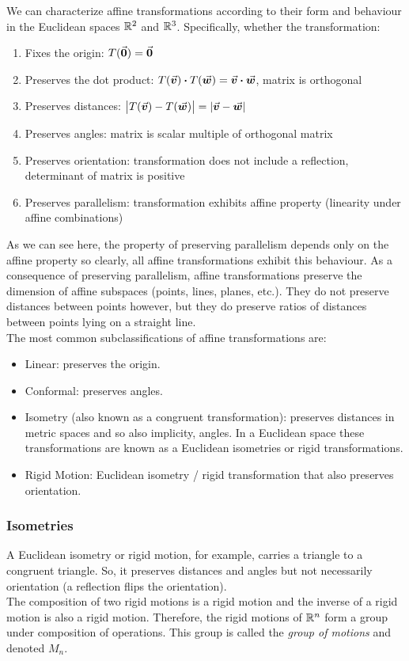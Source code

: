 \documentclass[MathsNotesBase.tex]{subfiles}
\begin{document}
{	\bigskip\bigskip
	We can characterize affine transformations according to their form and behaviour in the Euclidean spaces $\mathbb{R}^{2}$ and $\mathbb{R}^{3}$. Specifically, whether the transformation:
	\begin{enumerate}
		\item{Fixes the origin: ${ T(\vec{\bm{0}}) = \vec{\bm{0}} }$}
		\item{Preserves the dot product: ${ T(\vec{\bm{v}})\boldsymbol{\cdot} T(\vec{\bm{w}}) = \vec{\bm{v}}\boldsymbol{\cdot}\vec{\bm{w}} }$, matrix is orthogonal}
		\item{Preserves distances: ${ \left\lvert T(\vec{\bm{v}}) - T(\vec{\bm{w}})\right\rvert = \left\lvert\vec{\bm{v}} - \vec{\bm{w}}\right\rvert }$}
		\item{Preserves angles: matrix is scalar multiple of orthogonal matrix}		
		\item{Preserves orientation: transformation does not include a reflection, determinant of matrix is positive}
		\item{Preserves parallelism: transformation exhibits affine property (linearity under affine combinations)}
	\end{enumerate}

	As we can see here, the property of preserving parallelism depends only on the affine property so clearly, all affine transformations exhibit this behaviour. As a consequence of preserving parallelism, affine transformations preserve the dimension of affine subspaces (points, lines, planes, etc.). They do not preserve distances between points however, but they do preserve ratios of distances between points lying on a straight line.\\
	
	\bigskip
	The most common subclassifications of affine transformations are:
	\begin{itemize}
		\item{Linear: preserves the origin.}
		\item{Conformal: preserves angles.}
		\item{Isometry (also known as a congruent transformation): preserves distances in metric spaces and so also implicity, angles. In a Euclidean space these transformations are known as a Euclidean isometries or rigid transformations.}
		\item{Rigid Motion: Euclidean isometry / rigid transformation that also preserves orientation.}
	\end{itemize}

	\bigskip
	\subsubsection{Isometries}
	\bigskip
	A Euclidean isometry or rigid motion, for example, carries a triangle to a congruent triangle. So, it preserves distances and angles but not necessarily orientation (a reflection flips the orientation).\\
	The composition of two rigid motions is a rigid motion and the inverse of a rigid motion is also a rigid motion. Therefore, the rigid motions of $\mathbb{R}^{n}$ form a group under composition of operations. This group is called the \textit{group of motions} and denoted $M_n$.
	
}
\end{document}
